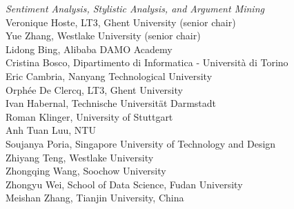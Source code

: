 \emph{Sentiment Analysis, Stylistic Analysis, and Argument Mining} \\
\hspace*{0.2in} Veronique Hoste, LT3, Ghent University (senior chair)\\
\hspace*{0.2in} Yue Zhang, Westlake University (senior chair)\\
\hspace*{0.2in} Lidong Bing, Alibaba DAMO Academy\\
\hspace*{0.2in} Cristina Bosco, Dipartimento di Informatica - Università di Torino\\
\hspace*{0.2in} Eric Cambria, Nanyang Technological University\\
\hspace*{0.2in} Orph\'ee De Clercq, LT3, Ghent University\\
\hspace*{0.2in} Ivan Habernal, Technische Universität Darmstadt\\
\hspace*{0.2in} Roman Klinger, University of Stuttgart\\
\hspace*{0.2in} Anh Tuan Luu, NTU\\
\hspace*{0.2in} Soujanya Poria, Singapore University of Technology and Design\\
\hspace*{0.2in} Zhiyang Teng, Westlake University\\
\hspace*{0.2in} Zhongqing Wang, Soochow University\\
\hspace*{0.2in} Zhongyu Wei, School of Data Science, Fudan University\\
\hspace*{0.2in} Meishan Zhang, Tianjin University, China\\

